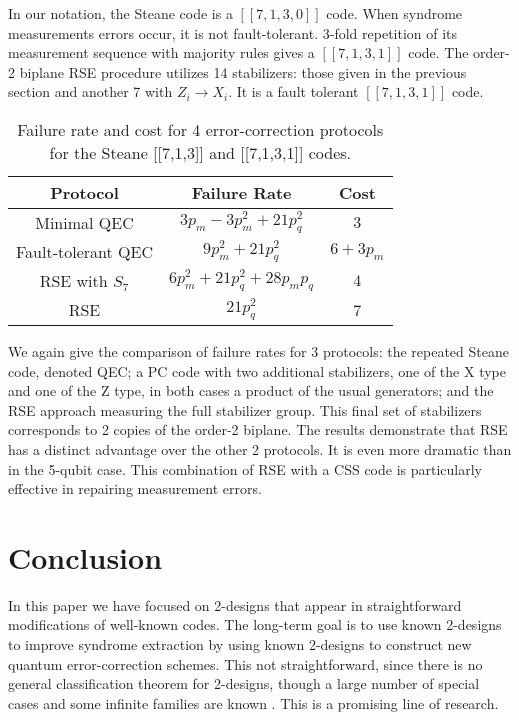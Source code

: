 \documentclass[reprint, superscriptaddress]{revtex4-1}
\numberwithin{equation}{section}
\numberwithin{figure}{section}
\numberwithin{table}{section}
\begin{document}
In our notation, the Steane code is a $[[7,1,3,0]]$ code.  When syndrome measurements errors occur, it is not fault-tolerant.  3-fold repetition of its measurement sequence with majority rules gives a $[[7,1,3,1]]$ code.  The order-2 biplane RSE procedure utilizes 14 stabilizers: those given in the previous section and another 7 with $Z_i \rightarrow X_i$.  It is a fault tolerant $[[7,1,3,1]]$ code. 
\begin{table}[h]
\begin{tabular} {c|c|c}

Protocol & Failure Rate & Cost \\
\hline\hline
Minimal QEC & $3p_m - 3p_m^2 + 21p_q^2$  &  $3$ \\
Fault-tolerant QEC  & $9 p_m^2 + 21 p_q^2$  &  $6 + 3 p_m$  \\

RSE with $S_7$ & $6p_m^2 + 21p_q^2 + 28 p_m p_q$ & $4$ \\

RSE  &  $21 p_q^2$  &  7\\

\end{tabular}
	\caption {Failure rate and cost for 4 error-correction protocols 
	for the Steane [[7,1,3]] and [[7,1,3,1]] codes.}
\end{table}
We again give the comparison of failure rates for 3 protocols: the repeated Steane code, denoted QEC; a PC code with two additional stabilizers, one of the X type and one of the Z type, in both cases a product of the usual generators; and the RSE approach measuring the full stabilizer group. This final set of stabilizers corresponds to 2 copies of the order-2 biplane.  The results demonstrate that RSE has a distinct advantage over the other 2 protocols.  It is even more dramatic than in the 5-qubit case.  This combination of RSE with a CSS code is particularly effective in repairing measurement errors.       

\section{Conclusion}

In this paper we have focused on 2-designs that appear in straightforward modifications of well-known codes.  The long-term goal is to use known 2-designs to improve syndrome extraction by using known 2-designs to construct new quantum error-correction schemes. This not straightforward, since there is no general classification theorem for 2-designs, though a large number of special cases and some infinite families are known \cite{Rudolf1985}.  This is a promising line of research.
\end{document}
